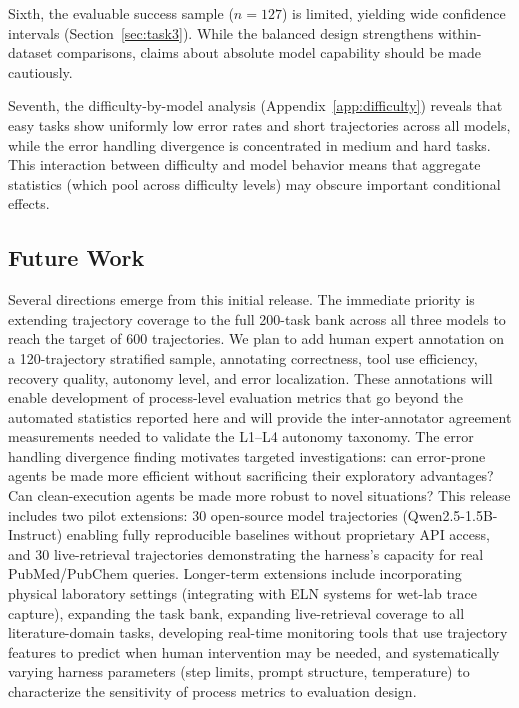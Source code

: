 \documentclass{article}
\begin{document}
Sixth, the evaluable success sample ($n=127$) is limited, yielding wide confidence intervals (Section~\ref{sec:task3}). While the balanced design strengthens within-dataset comparisons, claims about absolute model capability should be made cautiously.

Seventh, the difficulty-by-model analysis (Appendix~\ref{app:difficulty}) reveals that easy tasks show uniformly low error rates and short trajectories across all models, while the error handling divergence is concentrated in medium and hard tasks. This interaction between difficulty and model behavior means that aggregate statistics (which pool across difficulty levels) may obscure important conditional effects.

\subsection{Future Work}

Several directions emerge from this initial release. The immediate priority is extending trajectory coverage to the full 200-task bank across all three models to reach the target of 600 trajectories. We plan to add human expert annotation on a 120-trajectory stratified sample, annotating correctness, tool use efficiency, recovery quality, autonomy level, and error localization. These annotations will enable development of process-level evaluation metrics that go beyond the automated statistics reported here and will provide the inter-annotator agreement measurements needed to validate the L1--L4 autonomy taxonomy. The error handling divergence finding motivates targeted investigations: can error-prone agents be made more efficient without sacrificing their exploratory advantages? Can clean-execution agents be made more robust to novel situations? This release includes two pilot extensions: 30 open-source model trajectories (Qwen2.5-1.5B-Instruct) enabling fully reproducible baselines without proprietary API access, and 30 live-retrieval trajectories demonstrating the harness's capacity for real PubMed/PubChem queries. Longer-term extensions include incorporating physical laboratory settings (integrating with ELN systems for wet-lab trace capture), expanding the task bank, expanding live-retrieval coverage to all literature-domain tasks, developing real-time monitoring tools that use trajectory features to predict when human intervention may be needed, and systematically varying harness parameters (step limits, prompt structure, temperature) to characterize the sensitivity of process metrics to evaluation design.
\end{document}

